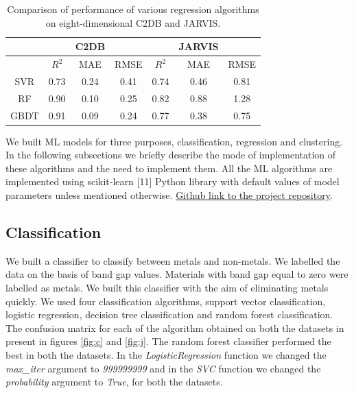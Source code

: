 \documentclass{article}
\begin{document}
\begin{table}[]
\centering
\caption{Comparison of performance of various regression algorithms on eight-dimensional C2DB and JARVIS.}
\label{tab:only}
\begin{tabular}{@{}ccccccc@{}}
\toprule
\multicolumn{1}{l}{} & \multicolumn{1}{l}{} & C2DB & \multicolumn{1}{l}{} & \multicolumn{1}{l}{} & JARVIS & \multicolumn{1}{l}{} \\ \midrule
\multicolumn{1}{l}{} & $R^2$                & MAE  & RMSE                 & $R^2$                & MAE    & RMSE                 \\
SVR                  & 0.73                 & 0.24  & 0.41                 & 0.74                 & 0.46   & 0.81                 \\
RF                   & 0.90                 & 0.10  & 0.25                & 0.82                 & 0.88   & 1.28                 \\
GBDT                 & 0.91                 & 0.09 & 0.24                 & 0.77                 & 0.38   & 0.75                 \\ \bottomrule
\end{tabular}
\end{table}

We built ML models for three purposes, classification, regression and clustering. In the following subsections we briefly describe the mode of implementation of these algorithms and the need to implement them. All the ML algorithms are implemented using scikit-learn [11] Python library with default values of model parameters unless mentioned otherwise. \href{https://github.com/SagarPrakashBarad/ML-EBGEstimate}{Github link to the project repository}.

\subsection{Classification}

We built a classifier to classify between metals and non-metals. We labelled the data on the basis of band gap values. Materials with band gap equal to zero were labelled as metals. We built this classifier with the aim of eliminating metals quickly. We used four classification algorithms, support vector classification, logistic regression, decision tree classification and random forest classification. The confusion matrix for each of the algorithm obtained on both the datasets in present in figures \ref{fig:c} and \ref{fig:j}. The random forest classifier performed the best in both the datasets. In the \emph{LogisticRegression} function we changed the \emph{max\_iter} argument to \emph{999999999} and in the \emph{SVC} function we changed the \emph{probability} argument to \emph{True}, for both the datasets. 
\end{document}
